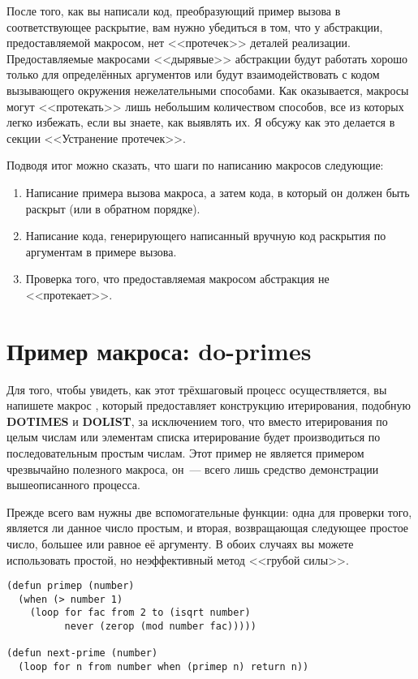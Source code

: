 После того, как вы написали код, преобразующий пример вызова в соответствующее раскрытие,
вам нужно убедиться в том, что у абстракции, предоставляемой макросом, нет <<протечек>>
деталей реализации. Предоставляемые макросами <<дырявые>> абстракции будут работать хорошо
только для определённых аргументов или будут взаимодействовать с кодом вызывающего
окружения нежелательными способами. Как оказывается, макросы могут <<протекать>> лишь
небольшим количеством способов, все из которых легко избежать, если вы знаете, как
выявлять их. Я обсужу как это делается в секции <<Устранение протечек>>.

Подводя итог можно сказать, что шаги по написанию макросов следующие:

\begin{enumerate}
\item Написание примера вызова макроса, а затем кода, в который он должен быть раскрыт
  (или в обратном порядке).
  
\item Написание кода, генерирующего написанный вручную код раскрытия по аргументам в
  примере вызова.

\item Проверка того, что предоставляемая макросом абстракция не <<протекает>>.
\end{enumerate}

\section{Пример макроса: do-primes}

Для того, чтобы увидеть, как этот трёхшаговый процесс осуществляется, вы напишете макрос
, который предоставляет конструкцию итерирования, подобную
\textbf{DOTIMES} и \textbf{DOLIST}, за исключением того, что вместо итерирования по целым
числам или элементам списка итерирование будет производиться по последовательным простым
числам. Этот пример не является примером чрезвычайно полезного макроса, он~--- всего лишь
средство демонстрации вышеописанного процесса.

Прежде всего вам нужны две вспомогательные функции: одна для проверки того, является ли
данное число простым, и вторая, возвращающая следующее простое число, большее или равное
её аргументу. В обоих случаях вы можете использовать простой, но неэффективный метод
<<грубой силы>>.

\begin{lstlisting}
(defun primep (number)
  (when (> number 1)
    (loop for fac from 2 to (isqrt number) 
          never (zerop (mod number fac)))))

(defun next-prime (number)
  (loop for n from number when (primep n) return n))
\end{lstlisting}

